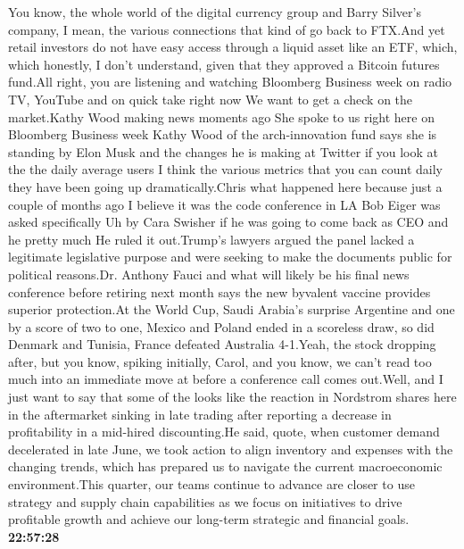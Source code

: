 \documentclass{article}%
\begin{document}
You know, the whole world of the digital currency group and Barry Silver's company, I mean, the various connections that kind of go back to FTX.And yet retail investors do not have easy access through a liquid asset like an ETF, which, which honestly, I don't understand, given that they approved a Bitcoin futures fund.All right, you are listening and watching Bloomberg Business week on radio TV, YouTube and on quick take right now We want to get a check on the market.Kathy Wood making news moments ago She spoke to us right here on Bloomberg Business week Kathy Wood of the arch{-}innovation fund says she is standing by Elon Musk and the changes he is making at Twitter if you look at the the daily average users I think the various metrics that you can count daily they have been going up dramatically.Chris what happened here because just a couple of months ago I believe it was the code conference in LA Bob Eiger was asked specifically Uh by Cara Swisher if he was going to come back as CEO and he pretty much He ruled it out.Trump's lawyers argued the panel lacked a legitimate legislative purpose and were seeking to make the documents public for political reasons.Dr. Anthony Fauci and what will likely be his final news conference before retiring next month says the new byvalent vaccine provides superior protection.At the World Cup, Saudi Arabia's surprise Argentine and one by a score of two to one, Mexico and Poland ended in a scoreless draw, so did Denmark and Tunisia, France defeated Australia 4{-}1.Yeah, the stock dropping after, but you know, spiking initially, Carol, and you know, we can't read too much into an immediate move at before a conference call comes out.Well, and I just want to say that some of the looks like the reaction in Nordstrom shares here in the aftermarket sinking in late trading after reporting a decrease in profitability in a mid{-}hired discounting.He said, quote, when customer demand decelerated in late June, we took action to align inventory and expenses with the changing trends, which has prepared us to navigate the current macroeconomic environment.This quarter, our teams continue to advance are closer to use strategy and supply chain capabilities as we focus on initiatives to drive profitable growth and achieve our long{-}term strategic and financial goals.%
\textbf{22:57:28}%
\newline%
\end{document}
